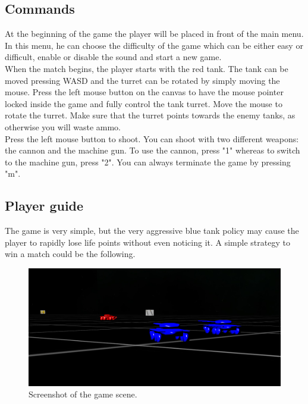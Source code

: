 \documentclass[14pt]{article}
\begin{document}
\subsection{Commands}
At the beginning of the game the player will be placed in front of the main menu. In this menu, he can choose the difficulty of the game which can be either easy or difficult, enable or disable the sound and start a new game. \\
When the match begins, the player starts with the red tank. The tank can be moved pressing WASD and the turret can be rotated by simply moving the mouse. Press the left mouse button on the canvas to have the mouse pointer locked inside the game and fully control the tank turret. Move the mouse to rotate the turret. Make sure that the turret points towards the enemy tanks, as otherwise you will waste ammo.\\
Press the left mouse button to shoot. You can shoot with two different weapons: the cannon and the machine gun. To use the cannon, press "1" whereas to switch to the machine gun, press "2". You can always terminate the game by pressing "m".
\subsection{Player guide} 
The game is very simple, but the very aggressive blue tank policy may cause the player to rapidly lose life points without even noticing it. A simple strategy to win a match could be the following. \\


\begin{figure}[H]
\includegraphics[width=12cm]{images/game.png}
\caption{Screenshot of the game scene.}
\label{img:machineGun}
\end{figure}
\end{document}
